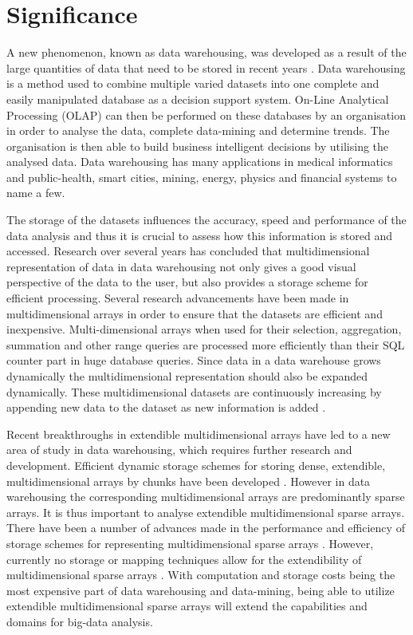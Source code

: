 \section{Significance}
A new phenomenon, known as data warehousing, was developed as a result of the large quantities of data that need to be stored in recent years \cite{golfarelli:2009:dwd}. Data warehousing is a method used to combine multiple varied datasets into one complete and easily manipulated database as a decision support system. On-Line Analytical Processing (OLAP) can then be performed on these databases by an organisation in order to analyse the data, complete data-mining and determine trends. The organisation is then able to build business intelligent decisions by utilising the analysed data. Data warehousing has many applications in medical informatics and public-health, smart cities, mining, energy, physics and financial systems to name a few.

The storage of the datasets influences the accuracy, speed and performance of the data analysis and thus it is crucial to assess how this information is stored and accessed. Research over several years has concluded that multidimensional representation of data in data warehousing not only gives a good visual perspective of the data to the user, but also provides a storage scheme for efficient processing. Several research advancements have been made in multidimensional arrays in order to ensure that the datasets are efficient and inexpensive. Multi-dimensional arrays when used for their selection, aggregation, summation and other range queries are processed more efficiently than their SQL counter part in huge database queries. Since data in a data warehouse grows dynamically the multidimensional representation should also be expanded dynamically. These multidimensional datasets are continuously increasing by appending new data to the dataset as new information is added \cite{otoo:2006:esa}.

Recent breakthroughs in extendible multidimensional arrays have led to a new area of study in data warehousing, which requires further research and development. Efficient dynamic storage schemes for storing dense, extendible, multidimensional arrays by chunks have been developed \cite{nimako:2012:ced,pedereira:2015:cas}. However in data warehousing the corresponding multidimensional arrays are predominantly sparse arrays. It is thus important to analyse extendible multidimensional sparse arrays. There have been a number of advances made in the performance and efficiency of storage schemes for representing multidimensional sparse arrays \cite{otoo:2016:msa,goil:bess,otoo:2014:nas}. However, currently no storage or mapping techniques allow for the extendibility of multidimensional sparse arrays \cite{nimako:2016:cea}. With computation and storage costs being the most expensive part of data warehousing and data-mining, being able to utilize extendible multidimensional sparse arrays will extend the capabilities and domains for big-data analysis. %

